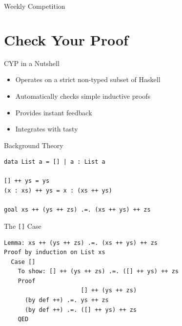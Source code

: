\documentclass{beamer}
\begin{document}
\begin{frame}{Weekly Competition}
{\begin{figure}
\end{figure}
}
\end{frame}

\section{Check Your Proof}

\begin{frame}{CYP in a Nutshell}

\begin{itemize}[<+->]
  \item Operates on a strict non-typed subset of Haskell
  \item Automatically checks simple inductive proofs
  \item Provides instant feedback
  \item Integrates with tasty
\end{itemize}
\end{frame}

\begin{frame}[fragile]{Background Theory}
  \begin{lstlisting}
data List a = [] | a : List a

[] ++ ys = ys
(x : xs) ++ ys = x : (xs ++ ys)

goal xs ++ (ys ++ zs) .=. (xs ++ ys) ++ zs
  \end{lstlisting}
\end{frame}

\begin{frame}[fragile]{The \texttt{[]} Case}
  \begin{lstlisting}
Lemma: xs ++ (ys ++ zs) .=. (xs ++ ys) ++ zs
Proof by induction on List xs
  Case []
    To show: [] ++ (ys ++ zs) .=. ([] ++ ys) ++ zs
    Proof
                      [] ++ (ys ++ zs)
      (by def ++) .=. ys ++ zs
      (by def ++) .=. ([] ++ ys) ++ zs
    QED
  \end{lstlisting}
\end{frame}
\end{document}
